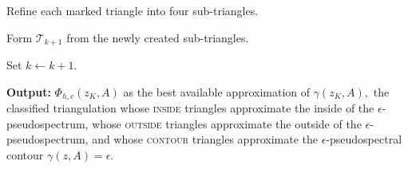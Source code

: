\begin{algorithm}[ht]
\begin{algorithmic}[1]
        \EndFor

        \State Refine each marked triangle into four sub-triangles.

        \State Form $\mathcal{T}_{k+1}$ from the newly created sub-triangles.

        \State Set $k\gets k+1$.

    \EndWhile

\end{algorithmic}

\textbf{Output:} $\Phi_{h, c}(z_K, A)$ as the best available approximation of $\gamma(z_K, A),$ the classified triangulation whose \textsc{inside} triangles approximate the inside of the $\epsilon$-pseudospectrum, whose \textsc{outside} triangles approximate the outside of the $\epsilon$-pseudospectrum, and whose \textsc{contour} triangles approximate the $\epsilon$-pseudospectral contour
$\gamma(z,A)=\epsilon$.  

\end{algorithm}